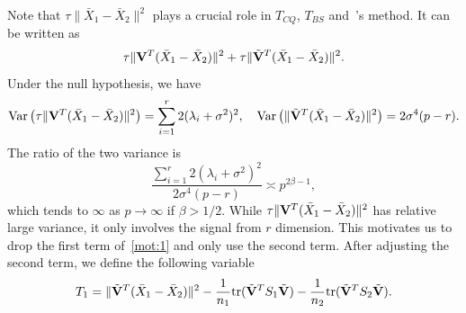 \documentclass[review]{elsarticle}
\DeclareMathOperator{\myVar}{Var}
\theoremstyle{plain}
\theoremstyle{definition}
\theoremstyle{remark}
\begin{document}
Note that  $
    \tau\|\bar{X}_1-\bar{X}_2\|^2
$ plays a crucial role in $T_{CQ}$, $T_{BS}$ and~\cite{Ma2015A}'s method.
It can be written as
\begin{equation}\label{mot:1}
    \tau \|\mathbf{V}^T (\bar{X}_1-\bar{X}_2)\|^2+
    \tau\|\tilde{\mathbf{V}}^T (\bar{X}_1-\bar{X}_2)\|^2.
\end{equation}
Under the null hypothesis, we have
$$\myVar\big(\tau \|\BV^T (\bar{X}_1-\bar{X}_2)\|^2\big)=\sum_{i=1}^r 2(\lambda_i+\sigma^2)^2,\quad 
\myVar\big(\|\tilde{\BV}^T (\bar{X}_1-\bar{X}_2)\|^2\big)=2\sigma^4 (p-r).$$
The ratio of the two variance is
$$
\frac{\sum_{i=1}^r 2(\lambda_i+\sigma^2)^2}{2\sigma^4 (p-r)}
\asymp
p^{2\beta-1},
$$
which tends to $\infty$ as $p\to \infty$ if $\beta>1/2$.
While $
    \tau \|\mathbf{V}^T (\bar{X}_1-\bar{X}_2)\|^2
$ has relative large variance, it only involves the signal from $r$ dimension.
 This motivates us to drop the first term of~\eqref{mot:1} and only use the second term.
After adjusting the second term, we define the following variable
\begin{equation*}
\begin{aligned}
    T_{1}&=\|\tilde{\mathbf{V}}^T(\bar{X}_1-\bar{X}_2)\|^2-\frac{1}{n_1}\mathrm{tr}(\tilde{\mathbf{V}}^T S_1\tilde{\mathbf{V}})-\frac{1}{n_2}\mathrm{tr}(\tilde{\mathbf{V}}^T S_2\tilde{\mathbf{V}}).
    \\
\end{aligned}
\end{equation*}
\end{document}

